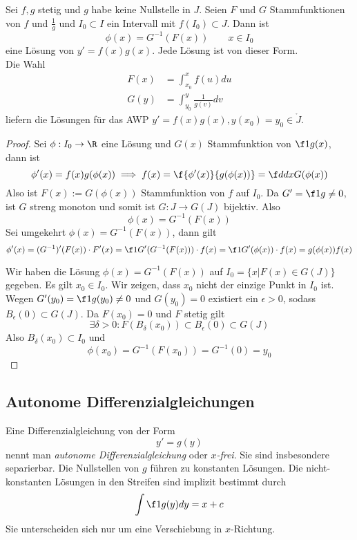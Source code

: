 \documentclass[a4paper,10pt]{scrbook}
\begin{document}
\begin{st}
	Sei $f,g$ stetig und $g$ habe keine Nullstelle in $J$. Seien $F$ und $G$ Stammfunktionen von
	$f$ und $\frac{1}{g}$ und $I_0\subset I$ ein Intervall mit $f(I_0)\subset J$. Dann ist
	\[
	\phi(x)=G^{-1}(F(x)) \qquad x\in I_0
	\]
	eine Lösung von $y'=f(x)g(x)$. Jede Lösung ist von dieser Form.\\
	Die Wahl 
	\begin{align*}
		F(x)&=\int_{x_0}^xf(u)du\\
	 G(y)&=\int_{y_0}^y\frac{1}{g(v)}dv
	\end{align*}
	liefern die Lösungen für das AWP $y'=f(x)g(x), y(x_0)=y_0 \in \mathring J$.
	\begin{proof}
		Sei $\phi : I_0 \to \R$ eine Lösung und $G(x)$ Stammfunktion von $\f 1{g(x)}$, dann ist
		\[
			\phi'(x) = f(x)g(\phi(x)) \implies f(x) = \f {\phi'(x)}{g(\phi(x))} = \f d{dx} G(\phi(x))
		\]
		Also ist $F(x) := G(\phi(x))$ Stammfunktion von $f$ auf $I_0$.
		Da $G' = \f 1g \neq 0$, ist $G$ streng monoton und somit ist $G: J\to G(J)$ bijektiv.
		Also
		\[
			\phi(x) = G^{-1}(F(x))
		\]
		Sei umgekehrt $\phi(x) = G^{-1}(F(x))$, dann gilt
		\[
			\phi'(x) = (G^{-1})'(F(x))\cdot F'(x) = \f 1{G'(G^{-1}(F(x)))} \cdot f(x) = \f 1 {G'(\phi(x))} \cdot f(x) = g(\phi(x))f(x)
		\]

		Wir haben die Lösung $\phi(x) = G^{-1}(F(x))$ auf $I_0 = \{x\big| F(x)\in G(J)\}$ gegeben.
		Es gilt $x_0\in I_0$.
		Wir zeigen, dass $x_0$ nicht der einzige Punkt in $I_0$ ist.
		Wegen $G'(y_0) = \f 1 {g(y_0)}\neq 0$ und $G(y_0) = 0$ existiert ein $\epsilon > 0$, sodass $B_\epsilon(0) \subset G(J)$.
		Da $F(x_0) = 0$ und $F$ stetig gilt
		\[
			\exists \delta > 0 : F(B_\delta(x_0)) \subset B_\epsilon(0) \subset G(J)
		\]
		Also $B_\delta(x_0) \subset I_0$  und
		\[
			\phi(x_0) = G^{-1}(F(x_0)) = G^{-1}(0) = y_0
		\]
	\end{proof}
\end{st}

\subsection{Autonome Differenzialgleichungen}

\begin{df*}
	Eine Differenzialgleichung von der Form
	\[
		y'=g(y)
	\]
	nennt man \emph{autonome Differenzialgleichung} oder \emph{$x$-frei}.
	Sie sind insbesondere separierbar.
	Die Nullstellen von $g$ führen zu konstanten Lösungen.
	Die nicht-konstanten Lösungen in den Streifen sind implizit bestimmt durch
	\[
		\int \f 1{g(y)}dy = x + c
	\]
	Sie unterscheiden sich nur um eine Verschiebung in $x$-Richtung.
\end{df*}
\end{document}
